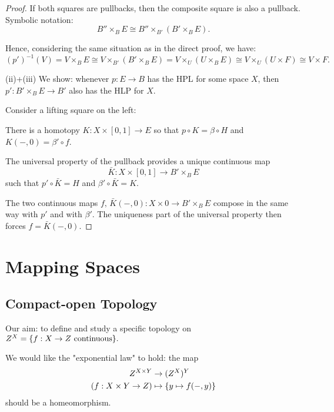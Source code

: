 \begin{proof}
If both squares are pullbacks, then the composite square is also a pullback. Symbolic notation:
\[B''\times_B E\cong B''\times_{B'}(B'\times_B E).\]

Hence, considering the same situation as in the direct proof, we have:
\[(p')^{-1}(V)=V\times_B E\cong V\times_{B'}(B'\times_B E)= V\times_U(U\times_B E)\cong V\times_U(U\times F)\cong V\times F.\]

(ii)+(iii) We show: whenever $p:E\to B$ has the HPL for some space $X$, then $p':B'\times_B E\to B'$ also has the HLP for $X$.

Consider a lifting square on the left:
\begin{center}
\end{center}

There is a homotopy $K:X\times[0,1]\to E$ so that $p\circ K=\beta\circ H$ and $K(-,0)=\beta'\circ f$.

The universal property of the pullback provides a unique continuous map
\[\bar K:X\times[0,1]\to B'\times_B E\]
such that $p'\circ \bar K=H$ and $\beta'\circ\bar K=K$.

The two continuous maps $f,\,\bar K(-,0):X\times0\to B'\times_B E$ compose in the same way with $p'$ and with $\beta'$. The uniqueness part of the universal property then forces $f=\bar K(-,0)$.
\end{proof}

\chapter{Mapping Spaces}

\section{Compact-open Topology}

Our aim: to define and study a specific topology on $Z^X=\{f:X\to Z\text{ continuous}\}.$

We would like the "exponential law" to hold: the map
\begin{align*}
    Z^{X\times Y}&\to(Z^X)^Y\\
    (f:X\times Y\to Z)&\mapsto \{y\mapsto f(-,y)\}
\end{align*}
should be a homeomorphism.


